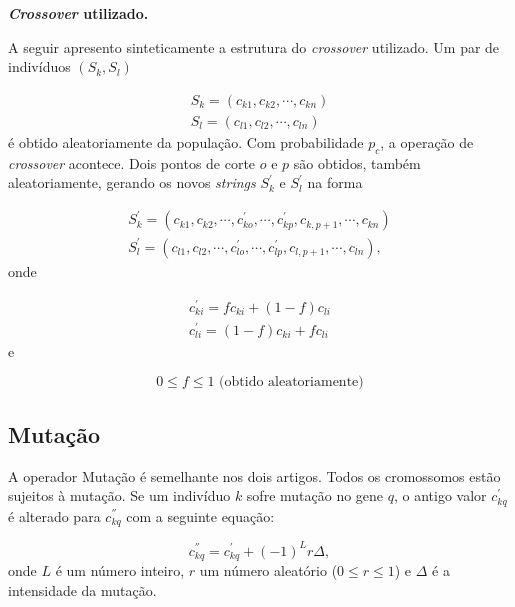 	\textbf{\emph{Crossover} utilizado.}
	
	A seguir apresento sinteticamente a estrutura do \emph{crossover} utilizado. Um par de indivíduos $(S_k, S_l)$
	
	\begin{equation}
		\begin{array}{l}
			S_k = (c_{k1}, c_{k2}, \cdots, c_{kn})	\\
			S_l = (c_{l1}, c_{l2}, \cdots, c_{ln})	
		\end{array}
	\end{equation}
	é obtido aleatoriamente da população. Com probabilidade $p_c$, a operação de \emph{crossover} acontece. Dois pontos de corte $o$ e $p$ são obtidos, também aleatoriamente, gerando os novos \emph{strings} $S^{'}_k$ e $S^{'}_l$ na forma
		
	\begin{equation}
		\begin{array}{l}
			S^{'}_k = (c_{k1}, c_{k2}, \cdots, c^{'}_{ko}, \cdots , c^{'}_{kp}, c_{k,p+1}, \cdots, c_{kn})	\\
			S^{'}_l = (c_{l1}, c_{l2}, \cdots, c^{'}_{lo}, \cdots , c^{'}_{lp}, c_{l,p+1}, \cdots, c_{ln}),
		\end{array}
	\end{equation}
	onde
	
	\begin{equation}
		\begin{array}{l}
			c^{'}_{ki} = f c_{ki} + (1 - f) c_{li}     \\
			c^{'}_{li} = (1 - f) c_{ki} + f c_{li}
		\end{array}
	\end{equation}
	e
	
	\begin{equation}
	0 \leq f \leq 1 \mbox{       (obtido aleatoriamente)}
	\end{equation}

\subsection{Mutação}

	A operador Mutação é semelhante nos dois artigos. Todos os cromossomos estão sujeitos à mutação. Se um indivíduo $k$ sofre mutação no gene $q$, o antigo valor $c^{'}_{kq}$ é alterado para $c^{''}_{kq}$ com a seguinte equação:

		\begin{equation}\label{eq:mutacao}
			c^{''}_{kq} = c^{'}_{kq} + (-1)^{L} r \Delta,
		\end{equation}
		onde $L$ é um número inteiro, $r$ um número aleatório ($0 \leq r \leq 1$) e $\Delta$ é a intensidade da mutação.
		

